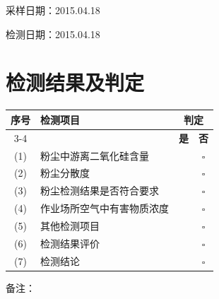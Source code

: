 \documentclass[UTF8,10pt,a4paper,fontset=fandol]{ctexart}
\newcommand{\fieldvalue}[1]{#1}
\newcommand{\handwritten}[1]{#1}
\begin{document}
\vspace{1em}

采样日期：\fieldvalue{\handwritten{2015.04.18}}

\hspace{3em}
检测日期：\fieldvalue{\handwritten{2015.04.18}}

\section*{检测结果及判定}

\begin{tabularx}{\textwidth}{|c|X|c|c|}
\hline
\textbf{序号} & \textbf{检测项目} & \multicolumn{2}{c|}{\textbf{判定}} \\
\cline{3-4}
 & & \textbf{是} & \textbf{否} \\
\hline
(1) & 粉尘中游离二氧化硅含量 & 
\fieldvalue{\handwritten{\checkmark}} & $\square$ \\
\hline
(2) & 粉尘分散度 & 
\fieldvalue{\handwritten{\checkmark}} & $\square$ \\
\hline
(3) & 粉尘检测结果是否符合要求 & 
\fieldvalue{\handwritten{\checkmark}} & $\square$ \\
\hline
(4) & 作业场所空气中有害物质浓度 & 
\fieldvalue{\handwritten{\checkmark}} & $\square$ \\
\hline
(5) & 其他检测项目 & 
\fieldvalue{\handwritten{\checkmark}} & $\square$ \\
\hline
(6) & 检测结果评价 & 
\fieldvalue{\handwritten{\checkmark}} & $\square$ \\
\hline
(7) & 检测结论 & 
\fieldvalue{\handwritten{\checkmark}} & $\square$ \\
\hline
\end{tabularx}

\vspace{1em}

\noindent
备注：
\end{document}

